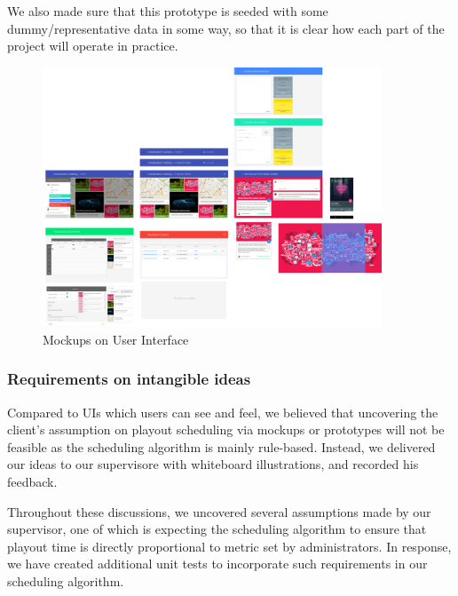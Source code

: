 \documentclass[a4paper, titlepage]{article}
\begin{document}
We also made sure that this prototype is seeded with some dummy/representative data in some way, so that it is clear how each part of the project will operate in practice.

\begin{figure}[ht]
   \begin{center}
      \includegraphics[width = 0.9\textwidth, trim = 0 0 0 0cm, clip]{./eval/mockup.png}
   \end{center}
   \caption{Mockups on User Interface}
   \label{fig:eval_mockup}
\end{figure}

\subsubsection{Requirements on intangible ideas}

Compared to UIs which users can see and feel, we believed that uncovering the client's assumption on playout scheduling via mockups or prototypes will not be feasible as the scheduling algorithm is mainly rule-based. Instead, we delivered our ideas to our supervisore with whiteboard illustrations, and recorded his feedback.

Throughout these discussions, we uncovered several assumptions made by our supervisor, one of which is expecting the scheduling algorithm to ensure that playout time is directly proportional to metric set by administrators. In response, we have created additional unit tests to incorporate such requirements in our scheduling algorithm.
\end{document}
